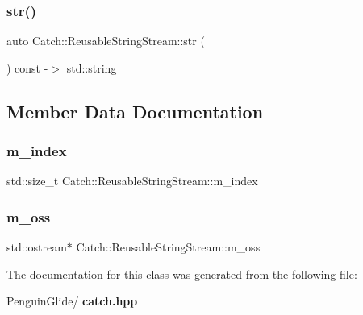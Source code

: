 \mbox{\label{class_catch_1_1_reusable_string_stream_a0e9ecf260b2a5d35f4886ef0d51f6270}} 
\subsubsection{str()}
{\footnotesize\ttfamily auto Catch\+::\+Reusable\+String\+Stream\+::str (\begin{DoxyParamCaption}{ }\end{DoxyParamCaption}) const -\/$>$  std\+::string}



\subsection{Member Data Documentation}
\mbox{\label{class_catch_1_1_reusable_string_stream_a6e8154ffe67117de424c491e3b192504}} 
\subsubsection{m\_index}
{\footnotesize\ttfamily std\+::size\+\_\+t Catch\+::\+Reusable\+String\+Stream\+::m\+\_\+index\hspace{0.3cm}{\ttfamily [private]}}

\mbox{\label{class_catch_1_1_reusable_string_stream_ae8dc0aa8ab418990869cd5ea9ee51f14}} 
\subsubsection{m\_oss}
{\footnotesize\ttfamily std\+::ostream$\ast$ Catch\+::\+Reusable\+String\+Stream\+::m\+\_\+oss\hspace{0.3cm}{\ttfamily [private]}}



The documentation for this class was generated from the following file\+:\begin{DoxyCompactItemize}
\item 
Penguin\+Glide/\textbf{ catch.\+hpp}\end{DoxyCompactItemize}
